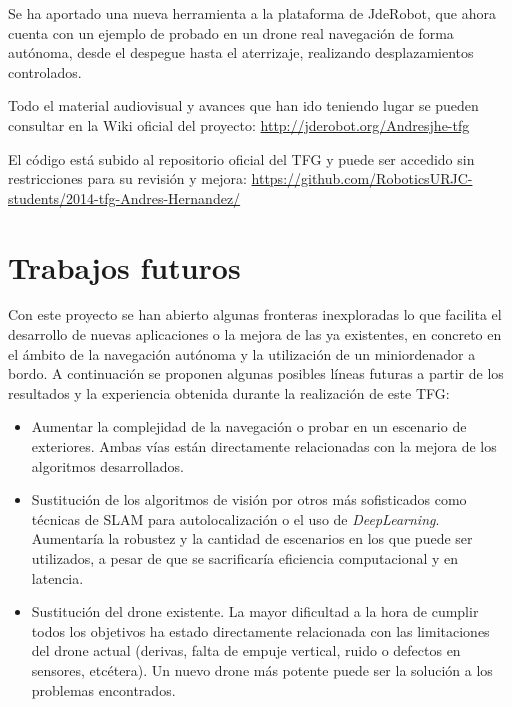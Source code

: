 Se ha aportado una nueva herramienta a la plataforma de JdeRobot, que ahora cuenta con un ejemplo de probado en un drone real navegación de forma autónoma, desde el despegue hasta el aterrizaje, realizando desplazamientos controlados. 

Todo el material audiovisual y avances que han ido teniendo lugar se pueden consultar en la Wiki oficial del proyecto: \url{http://jderobot.org/Andresjhe-tfg}

El código está subido al repositorio oficial del TFG y puede ser accedido sin restricciones para su revisión y mejora: \url{https://github.com/RoboticsURJC-students/2014-tfg-Andres-Hernandez/}

\section{Trabajos futuros}
Con este proyecto se han abierto algunas fronteras inexploradas lo que facilita el desarrollo de nuevas aplicaciones o la mejora de las ya existentes, en concreto en el ámbito de la navegación autónoma y la utilización de un miniordenador a bordo. A continuación se proponen algunas posibles líneas futuras a partir de los resultados y la experiencia obtenida durante la realización de este TFG:

\begin{itemize}
	\item Aumentar la complejidad de la navegación o probar en un escenario de exteriores. Ambas vías están directamente relacionadas con la mejora de los algoritmos desarrollados. 
	\item Sustitución de los algoritmos de visión por otros más sofisticados como técnicas de SLAM para autolocalización o el uso de \textit{DeepLearning}. Aumentaría la robustez y la cantidad de escenarios en los que puede ser utilizados, a pesar de que se sacrificaría eficiencia computacional y  en latencia.
	\item Sustitución del drone existente. La mayor dificultad a la hora de cumplir todos los objetivos ha estado directamente relacionada con las limitaciones del drone actual (derivas, falta de empuje vertical, ruido o defectos en sensores, etcétera). Un nuevo drone más potente puede ser la solución a los problemas encontrados.
\end{itemize}